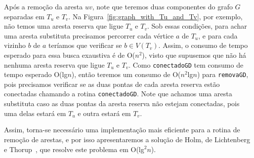 Após a remoção da aresta $uv$, note que teremos duas componentes do grafo $G$ separadas em $T_u$ e $T_v$. Na Figura~\ref{fig:graph_with_Tu_and_Tv}, por exemplo, não temos uma aresta reserva que ligue $T_u$ e $T_v$. Sob essas condições, para achar uma aresta substituta precisamos percorrer cada vértice $a$ de $T_u$, e para cada vizinho $b$ de $a$ teríamos que verificar se $b \in V(T_v)$. Assim, o consumo de tempo esperado para essa busca exaustiva é de O($n^2$), visto que supusemos que não há nenhuma aresta reserva que ligue $T_u$ e $T_v$. Como \texttt{conectadoGD} tem consumo de tempo esperado O(lg$n$), então teremos um consumo de O($n^2$lg$n$) para \texttt{removaGD}, pois precisamos verificar se as duas pontas de cada aresta reserva estão conectadas chamando a rotina \texttt{conectadoGD}. Note que achamos uma aresta substituta caso as duas pontas da aresta reserva não estejam conectadas, pois uma delas estará em $T_u$ e outra estará em $T_v$.

Assim, torna-se necessário uma implementação mais eficiente para a rotina de remoção de arestas, e por isso apresentaremos a solução de Holm, de Lichtenberg e Thorup~\cite{jacob_holm}, que resolve este problema em O(lg$^2n$).

